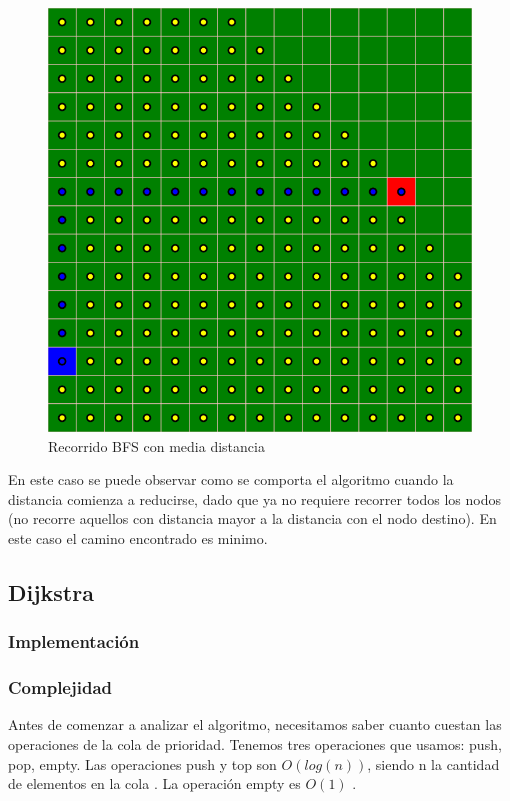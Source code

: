 \begin{figure}[H]
\centering
\includegraphics[width=\textwidth]{Graphics/BFSSampleGood.png}
\caption{Recorrido BFS con media distancia}
\end{figure}
En este caso se puede observar como se comporta el algoritmo cuando la distancia comienza a reducirse, dado que ya no requiere recorrer todos los nodos (no recorre aquellos con distancia mayor a la distancia con el nodo destino).
En este caso el camino encontrado es minimo.
\newpage

\subsection{Dijkstra}
\subsubsection{Implementación}

\subsubsection{Complejidad}
Antes de comenzar a analizar el algoritmo, necesitamos saber cuanto cuestan las operaciones de la cola de prioridad. Tenemos tres operaciones que usamos: push, pop, empty. Las operaciones push y top son $O(log(n))$, siendo n la cantidad de elementos en la cola \cite{PRIORITY_POP}\cite{PRIORITY_PUSH}. La operación empty es $O(1)$ \cite{PRIORITY_EMPTY}.

